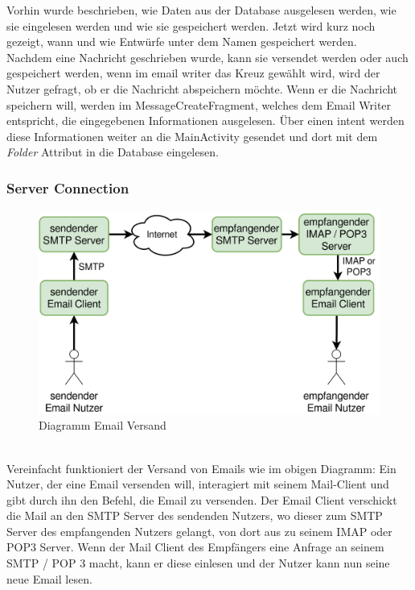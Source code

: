 \documentclass[a4paper,11pt]{article}
\begin{document}

\nohyphenation

Vorhin wurde beschrieben, wie Daten aus der Database ausgelesen werden, wie sie eingelesen werden und wie sie gespeichert werden. Jetzt wird kurz 
noch gezeigt, wann und wie Entwürfe unter dem Namen  gespeichert werden. \\

Nachdem eine Nachricht geschrieben wurde, kann sie versendet werden oder auch gespeichert werden, wenn im \gls{email writer} das Kreuz gewählt wird, wird der Nutzer 
gefragt, ob er die Nachricht abspeichern möchte. Wenn er die Nachricht speichern will, werden im MessageCreateFragment, welches dem Email Writer entspricht, die
eingegebenen Informationen ausgelesen. Über einen \gls{intent} werden diese Informationen weiter an die MainActivity gesendet und dort 
mit dem \textit{Folder} Attribut  in die Database eingelesen.\\

\endgroup

\subsubsection{Server Connection}

\begin{figure}[H]
\center
\includegraphics[width=.7\textwidth]{media/connection-diagram.png}
\caption{Diagramm Email Versand}
\end{figure}

\phantom{.} \\ %
Vereinfacht funktioniert der Versand von Emails wie im obigen Diagramm: Ein Nutzer, der eine Email versenden will, interagiert mit seinem Mail-Client und gibt durch ihn den Befehl, die Email zu versenden. Der Email Client verschickt die Mail an den SMTP Server des sendenden Nutzers, wo dieser zum SMTP Server des empfangenden Nutzers gelangt, von dort aus zu seinem IMAP oder POP3 Server. Wenn der Mail Client des Empfängers eine Anfrage an seinem SMTP / POP 3 macht, kann er diese einlesen und der Nutzer kann nun seine neue Email lesen.\\
\end{document}
